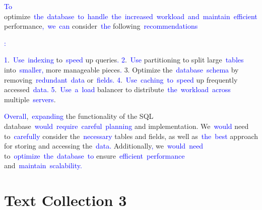 \documentclass{article}
\begin{document}
\begin{tcolorbox}[colframe=black,colback=white]
{}\textcolor{blue}{To} optimize\textcolor{blue}{~the}\textcolor{blue}{~database}\textcolor{blue}{~to}\textcolor{blue}{~handle}\textcolor{blue}{~the}\textcolor{blue}{~increased}\textcolor{blue}{~workload}\textcolor{blue}{~and}\textcolor{blue}{~maintain}\textcolor{blue}{~efficient} performance\textcolor{blue}{,}\textcolor{blue}{~we}\textcolor{blue}{~can} consider\textcolor{blue}{~the} following\textcolor{blue}{~recommendations}\textcolor{blue}{:

}\textcolor{blue}{1}.\textcolor{blue}{~Use}\textcolor{blue}{~indexing} to\textcolor{blue}{~speed} up queries\textcolor{blue}{.
}\textcolor{blue}{2}.\textcolor{blue}{~Use} partitioning to split large\textcolor{blue}{~tables} into\textcolor{blue}{~smaller}\textcolor{blue}{,} more manageable pieces\textcolor{blue}{.
}3. Optimize the\textcolor{blue}{~database}\textcolor{blue}{~schema} by removing\textcolor{blue}{~redundant}\textcolor{blue}{~data} or\textcolor{blue}{~fields}\textcolor{blue}{.
}\textcolor{blue}{4}.\textcolor{blue}{~Use}\textcolor{blue}{~caching}\textcolor{blue}{~to}\textcolor{blue}{~speed} up frequently accessed\textcolor{blue}{~data}\textcolor{blue}{.
}\textcolor{blue}{5}.\textcolor{blue}{~Use}\textcolor{blue}{~a}\textcolor{blue}{~load} balancer to distribute\textcolor{blue}{~the}\textcolor{blue}{~workload}\textcolor{blue}{~across} multiple\textcolor{blue}{~servers}.

\textcolor{blue}{Overall},\textcolor{blue}{~expanding} the functionality of the SQL database\textcolor{blue}{~would}\textcolor{blue}{~require}\textcolor{blue}{~careful}\textcolor{blue}{~planning} and implementation. We\textcolor{blue}{~would} need to\textcolor{blue}{~carefully} consider the\textcolor{blue}{~necessary} tables and fields, as well as\textcolor{blue}{~the}\textcolor{blue}{~best} approach for storing and accessing the\textcolor{blue}{~data}\textcolor{blue}{.} Additionally\textcolor{blue}{,} we\textcolor{blue}{~would}\textcolor{blue}{~need} to\textcolor{blue}{~optimize}\textcolor{blue}{~the}\textcolor{blue}{~database}\textcolor{blue}{~to} ensure\textcolor{blue}{~efficient}\textcolor{blue}{~performance} and\textcolor{blue}{~maintain}\textcolor{blue}{~scalability}\textcolor{blue}{.}\textcolor{blue}{}
\end{tcolorbox}


\section*{Text Collection 3}
\end{document}
